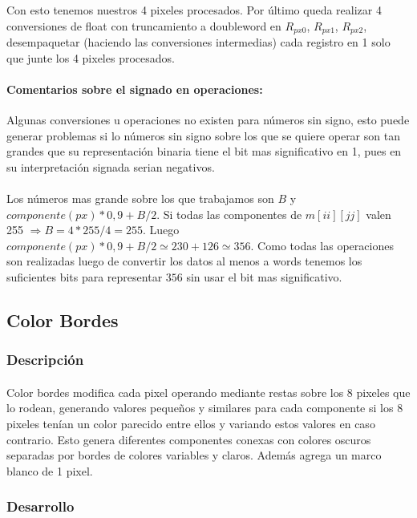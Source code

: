 \documentclass[a4paper]{article}
\begin{document}
Con esto tenemos nuestros 4 pixeles procesados. Por \'ultimo queda realizar 4 conversiones de float con truncamiento a doubleword en $R_{px0}$, $R_{px1}$, $R_{px2}$, desempaquetar (haciendo las conversiones intermedias) cada registro en 1 solo que junte los 4 pixeles procesados.

\paragraph{Comentarios sobre el signado en operaciones:} Algunas conversiones u operaciones no existen para n\'umeros sin signo, esto puede generar problemas si lo n\'umeros sin signo sobre los que se quiere operar son tan grandes que su representaci\'on binaria tiene el bit mas significativo en 1, pues en su interpretaci\'on signada serian negativos.
\paragraph{}Los n\'umeros mas grande sobre los que trabajamos son $B$ y $componente(px) * 0,9 + B/2$. Si todas las componentes de $m[ii][jj]$ valen 255 $\Rightarrow B = 4*255/4 = 255$. Luego $componente(px) * 0,9 + B/2 \simeq  230 + 126 \simeq 356$. Como todas las operaciones son realizadas luego de convertir los datos al menos a words tenemos los suficientes bits para representar $356$ sin usar el bit mas significativo.

\subsection{Color Bordes}
\subsubsection{Descripci\'on}

\paragraph{} Color bordes modifica cada pixel operando mediante restas sobre los 8 pixeles que lo rodean, generando valores pequeños y similares para cada componente si los 8 pixeles tenían un color parecido entre ellos y variando estos valores en caso contrario. Esto genera diferentes componentes conexas con colores oscuros separadas por bordes de colores variables y claros. Adem\'as agrega un marco blanco de 1 pixel.  

\subsubsection{Desarrollo}
\end{document}
